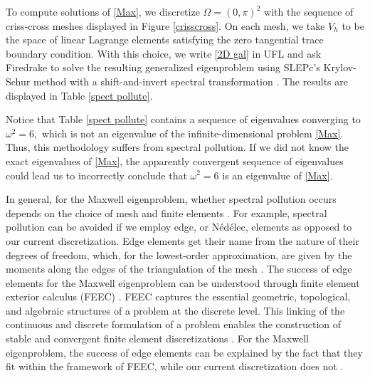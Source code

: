 To compute solutions of \eqref{Max}, we discretize $\Omega = (0, \pi)^2$ with the sequence of criss-cross meshes displayed in Figure \ref{crisscross}. On each mesh, we take $V_h$ to be the space of linear Lagrange elements satisfying the zero tangential trace boundary condition. With this choice, we write \eqref{2D gal} in UFL and ask Firedrake to solve the resulting generalized eigenproblem using SLEPc's Krylov-Schur method with a shift-and-invert spectral transformation \cite{slep}. The results are displayed in Table \ref{spect pollute}.


Notice that Table \ref{spect pollute} contains a sequence of eigenvalues converging to $\omega^2 = 6,$ which is not an eigenvalue of the infinite-dimensional problem \eqref{Max}. Thus, this methodology suffers from spectral pollution. If we did not know the exact eigenvalues of \eqref{Max}, the apparently convergent sequence of eigenvalues could lead us to incorrectly conclude that $\omega^2=6$ is an eigenvalue of \eqref{Max}. 


% 
% 






In general, for the Maxwell eigenproblem, whether spectral pollution occurs depends on the choice of mesh and finite elements \cite{Matt}. For example, spectral pollution can be avoided if we employ edge, or Nédélec, elements as opposed to our current discretization. Edge elements get their name from the nature of their degrees of freedom, which, for the lowest-order approximation, are given by the moments along the edges of the triangulation of the mesh \cite{Boffi}. The success of edge elements for the Maxwell eigenproblem can be understood through finite element exterior calculus (FEEC) \cite{Matt}. FEEC captures the essential geometric, topological, and algebraic structures of a problem at the discrete level. This linking of the continuous and discrete formulation of a problem enables the construction of stable and convergent finite element discretizations \cite{Arnold}. For the Maxwell eigenproblem, the success of edge elements can be explained by the fact that they fit within the framework of FEEC, while our current discretization does not \cite{Arnold, Boffi}. 

